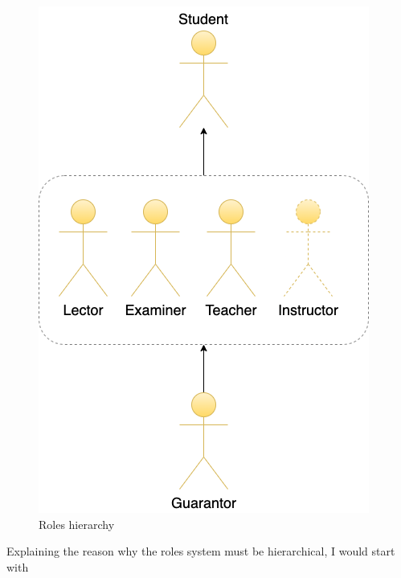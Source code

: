 \begin{figure}[h]
\centering
\includegraphics[scale=0.57]{../png/role.png}
\caption{Roles hierarchy}\label{picture:roles}
\end{figure}


\noindent Explaining the reason why the roles system must be hierarchical, I would start with 

